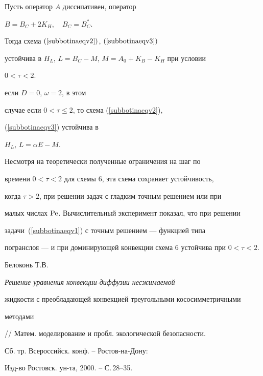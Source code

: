 \begin{thm}


\label{subbotinateo4}


Пусть оператор $A$ диссипативен, оператор 


$B=B_C+2K_H, \quad B_C=B_C^*$.


Тогда схема $(\ref{subbotinaeqv2})$, $(\ref{subbotinaeqv3})$


устойчива в $H_L$, $L=B_C-M$, $M=A_0+K_B - K_H$ при условии


$0 < \tau < 2$.


\end{thm}








\item[d)] если  $D=0$, $\omega =2$, в этом


случае если $0<\tau \le 2$, то схема (\ref{subbotinaeqv2}),


(\ref{subbotinaeqv3}) устойчива в


$H_L$,  $L=\alpha E-M$.





Несмотря на теоретически полученные ограничения на шаг по 


времени $0<\tau<2$ для схемы 6, эта схема сохраняет устойчивость, 


когда $\tau >2$, при решении задач с гладким точным решением или при 


малых числах $\operatorname{Pe}$. Вычислительный эксперимент показал, что при решении 


задачи~(\ref{subbotinaeqv1}) с точным решением --- функцией типа 


погранслоя --- и при доминирующей конвекции схема 6 устойчива при $0<\tau<2$.










Белоконь Т.В. {\it Решение уравнения конвекции-диффузии несжимаемой 


жидкости с преобладающей конвекцией треугольными кососимметричными 


методами} // Матем. моделирование и пробл. экологической безопасности. 


Сб. тр. Всероссийск. конф. -- Ростов-на-Дону: 


Изд-во Ростовск. ун-та, 2000. -- С.\,28--35.


